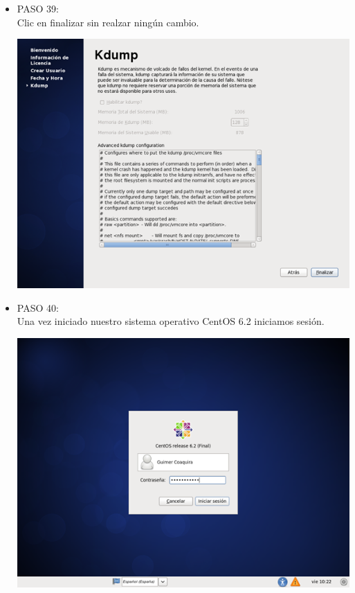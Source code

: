 \begin{itemize}
\item PASO 39:
\\Clic en finalizar sin realzar ningún cambio.
		\begin{center}
		\includegraphics[width=13cm]{./Imagenes/39}
		\end{center}
	
	\end{itemize} 

\begin{itemize}
\item PASO 40:
\\Una vez iniciado nuestro sistema operativo CentOS 6.2 iniciamos sesión.
		\begin{center}
		\includegraphics[width=13cm]{./Imagenes/40}
		\end{center}
		\\\
	\end{itemize} 

